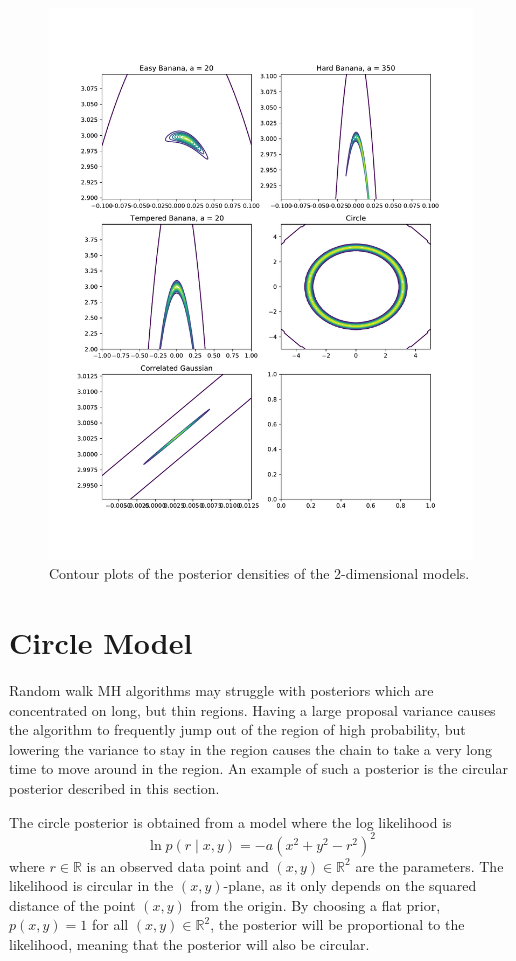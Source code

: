 \documentclass[english,twoside,openright]{HYgraduMLDS}
\newcommand{\R}{\mathbb{R}}
\begin{document}
\begin{figure}
  \centering
  \includegraphics[width=\textwidth]{figures/posterior_plots}
  \caption{
    Contour plots of the posterior densities of the 2-dimensional models.
  }
\end{figure}

\section{Circle Model}\label{circle_section}

Random walk MH algorithms may struggle with posteriors which are concentrated
on long, but thin regions. Having a large proposal variance causes the algorithm
to frequently jump out of the region of high probability, but lowering the
variance to stay in the region causes the chain to take a very long time to move
around in the region. An example of such a posterior is the circular posterior
described in this section.

The circle posterior is obtained from a model where the log likelihood is
\[
    \ln p(r\mid x, y) = -a(x^2 + y^2 - r^2)^2
\]
where \(r\in \R\) is an observed data point and \((x, y)\in \R^{2}\) are the
parameters.
The likelihood is circular in the \((x, y)\)-plane, as it only depends on the
squared distance of the point \((x, y)\) from the origin. By choosing a flat
prior, \(p(x, y) = 1\) for all \((x, y)\in \R^{2}\), the posterior will be
proportional to the likelihood, meaning that the posterior will also be circular.
\end{document}
